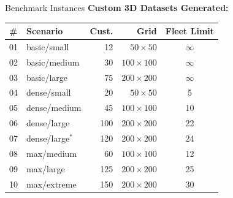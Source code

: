 \documentclass[11pt,aspectratio=169]{beamer}
\begin{document}
\begin{frame}{Benchmark Instances}
    \textbf{Custom 3D Datasets Generated:}
    \begin{table}
        \centering
        \footnotesize
        \begin{tabular}{llrrc}
            \toprule
            \textbf{\#} & \textbf{Scenario} & \textbf{Cust.} & \textbf{Grid} & \textbf{Fleet Limit} \\
            \midrule
            01 & basic/small     &  12 & $50 \times 50$   & $\infty$ \\
            02 & basic/medium    &  30 & $100 \times 100$ & $\infty$ \\
            03 & basic/large     &  75 & $200 \times 200$ & $\infty$ \\
            04 & dense/small     &  20 & $50 \times 50$   & 5 \\
            05 & dense/medium    &  45 & $100 \times 100$ & 10 \\
            06 & dense/large     & 100 & $200 \times 200$ & 22 \\
            07 & dense/large$^*$ & 120 & $200 \times 200$ & 24 \\
            08 & max/medium      &  60 & $100 \times 100$ & 12 \\
            09 & max/large       & 125 & $200 \times 200$ & 25 \\
            10 & max/extreme     & 150 & $200 \times 200$ & 30 \\
            \bottomrule
        \end{tabular}
    \end{table}
\end{frame}
\end{document}
